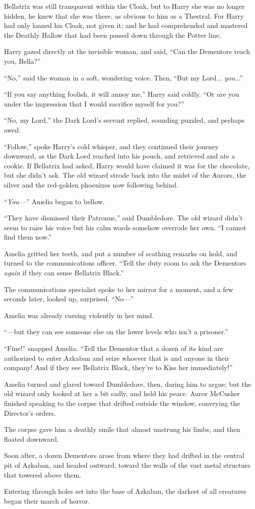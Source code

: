 Bellatrix was still transparent within the Cloak, but to Harry she was no longer hidden, he knew that she was there, as obvious to him as a Thestral. For Harry had only loaned his Cloak, not given it; and he had comprehended and mastered the Deathly Hallow that had been passed down through the Potter line.

Harry gazed directly at the invisible woman, and said, “Can the Dementors reach you, Bella?”

“No,” said the woman in a soft, wondering voice. Then, “But my Lord... \emph{you}...”

“If you say anything foolish, it will annoy me,” Harry said coldly. “Or are you under the impression that I would sacrifice myself for you?”

“No, my Lord,” the Dark Lord’s servant replied, sounding puzzled, and perhaps awed.

“Follow,” spoke Harry’s cold whisper, and they continued their journey downward, as the Dark Lord reached into his pouch, and retrieved and ate a cookie. If Bellatrix had asked, Harry would have claimed it was for the chocolate, but she didn’t ask.
\sbreak
The old wizard strode back into the midst of the Aurors, the silver and the red-golden phoenixes now following behind.

“\emph{You—}” Amelia began to bellow.

“They have dismissed their Patronus,” said Dumbledore. The old wizard didn’t seem to raise his voice but his calm words somehow overrode her own. “I cannot find them now.”

Amelia gritted her teeth, and put a number of scathing remarks on hold, and turned to the communications officer. “Tell the duty room to ask the Dementors \emph{again} if they can sense Bellatrix Black.”

The communications specialist spoke to her mirror for a moment, and a few seconds later, looked up, surprised. “No—”

Amelia was already cursing violently in her mind.

“—but they can see someone else on the lower levels who isn’t a prisoner.”

“Fine!” snapped Amelia. “Tell the Dementor that a dozen of its kind are authorized to enter Azkaban and seize whoever that is and anyone in their company! And if they see Bellatrix Black, they’re to Kiss her immediately!”

Amelia turned and glared toward Dumbledore, then, daring him to argue; but the old wizard only looked at her a bit sadly, and held his peace.
\sbreak
Auror McCusker finished speaking to the corpse that drifted outside the window, conveying the Director’s orders.

The corpse gave him a deathly smile that almost unstrung his limbs, and then floated downward.

Soon after, a dozen Dementors arose from where they had drifted in the central pit of Azkaban, and headed outward, toward the walls of the vast metal structure that towered above them.

Entering through holes set into the base of Azkaban, the darkest of all creatures began their march of horror.

